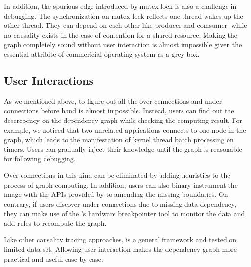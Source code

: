 In addition, the spurious edge introduced by mutex lock is also a challenge in
debugging. The synchronization on mutex lock reflects one thread wakes up the
other thread. They can depend on each other like producer and comsumer, while
no causality exists in the case of contention for a shared resource. Making the
graph completely sound without user interaction is almost impossible given the
essential attribite of commericial operating system as a grey box.

\subsection{User Interactions}


As we mentioned above, to figure out all the over connections and under
connections before hand is almost impossible. Instead, users can find out the
descrepency on the dependency graph while checking the computing result. For
example, we noticed that two unrelated applications connects to one node in the
graph, which leads to the manifestation of kernel thread batch processing on
timers. Users can gradually inject their knowledge until the graph is reasonable
for following debugging. 

Over connections in this kind can be eliminated by adding heuristics to the
process of graph computing. In addition, users can also binary instrument the
image with the APIs provided by \xxx to amending the missing boundaries. On
contrary, if users discover under connections due to missing data dependency,
they can make use of the \xxx's hardware breakpointer tool to monitor the data
and add rules to recompute the graph.

Like other causality tracing approaches, \xxx is a general framework and tested
on limited data set. Allowing user interaction makes the dependency graph more
practical and useful case by case.
